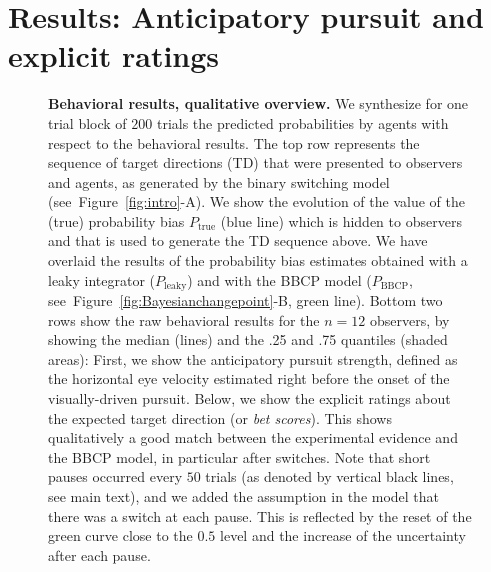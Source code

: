 \documentclass[10pt,letterpaper]{article}
\newcommand{\seeFig}[1]{Figure~\ref{fig:#1}}
\begin{document}
\section{Results: Anticipatory pursuit and explicit ratings}
\label{sec:results_psycho}
\begin{figure}%
\caption{
\textbf{Behavioral results, qualitative overview.} %
We synthesize for one trial block of $200$ trials the predicted probabilities by agents with respect to the behavioral results.
The top row represents the sequence of target directions (TD)
that were presented to observers and agents,
as generated by the binary switching model (see~\seeFig{intro}-A).
We show the evolution of the value
of the (true) probability bias $P_{\text{true}}$ (blue line)
which is hidden to observers
and that is used to generate the TD sequence above.
We have overlaid the results of
the probability bias estimates obtained with a leaky integrator ($P_{\text{leaky}}$)
and with the BBCP model ($P_{\text{BBCP}}$, see~\seeFig{Bayesianchangepoint}-B, green line).
Bottom two rows show the raw behavioral results
for the $n=12$ observers, by showing the median (lines) and the .25 and .75 quantiles (shaded areas):
First, we show the  anticipatory pursuit strength, defined
as the horizontal eye velocity estimated right before
the onset of the visually-driven pursuit.
Below, we show the explicit ratings about the expected target direction (or \textit{bet scores}).
This shows qualitatively a good match between
the experimental evidence and the BBCP model,
in particular after switches.
Note that short pauses occurred every $50$ trials
(as denoted by vertical black lines, see main text),
and we added the assumption in the model
that there was a switch at each pause.
This is reflected by the reset of the green curve close to the $0.5$ level and
the increase of the uncertainty after each pause. %
}
\label{fig:results_psycho}
\end{figure}
\end{document}
